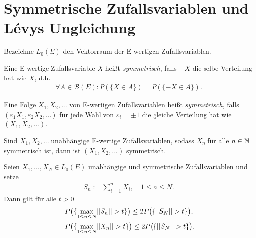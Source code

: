 \chapter{Symmetrische Zufallsvariablen und Lévys Ungleichung}
Bezeichne $L_0(E)$ den Vektorraum der E-wertigen-Zufallsvariablen. 
\begin{mydef}
    Eine E-wertige Zufallsvariable $X$ heißt \textit{symmetrisch}, falls $-X$ die selbe Verteilung hat wie $X$, d.h.
    \begin{align*}
        \forall A \in \mathcal{B}(E): P(\{X \in A\}) = P(\{-X \in A\}). 
    \end{align*}
\end{mydef}

\begin{mydef}
    Eine Folge $X_1,X_2,...$ von E-wertigen Zufallsvariablen heißt \textit{symmetrisch}, 
    falls $(\varepsilon_1 X_1, \varepsilon_2 X_2,...)$ für jede Wahl von $\varepsilon_i = \pm 1$ 
    die gleiche Verteilung hat wie $(X_1,X_2,...)$. 
\end{mydef}

\begin{remark}
   Sind $X_1,X_2,...$ unabhängige E-wertige Zufallsvariablen, sodass $X_n$ für alle $n \in \mathbb{N}$ symmetrisch ist, dann ist $(X_1,X_2,...)$ symmetrisch. 
\end{remark}

\begin{theorem}
    Seien $X_1,...,X_N \in L_0(E)$ unabhängige und symmetrische Zufallsvariablen und setze 
    \begin{align*}
        S_n := \sum_{i=1}^n X_i, \quad 1 \leq n \leq N. 
    \end{align*}
    Dann gilt für alle $t > 0$
    \begin{align}
        &P\big(\{ \max_{1 \leq n \leq N} \lvert \lvert S_n \rvert \rvert > t \}\big) \leq 2 P\big(\{\lvert \lvert S_N \rvert \rvert > t \}\big), \\\
        &P\big(\{ \max_{1 \leq n \leq N} \lvert \lvert X_n \rvert \rvert > t \}\big) \leq 2 P\big(\{\lvert \lvert S_N \rvert \rvert > t \}\big).
    \end{align}
\end{theorem}

